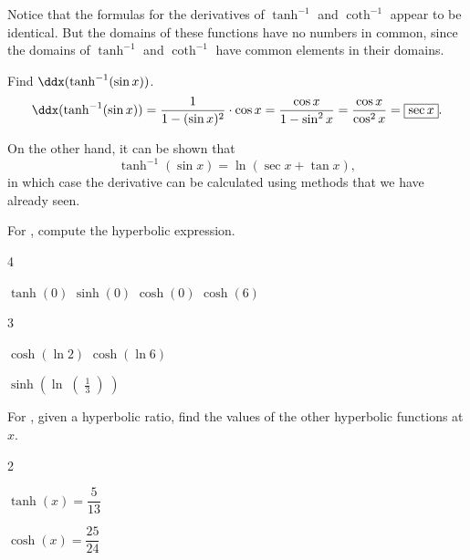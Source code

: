 \documentclass{book}
\begin{document}
Notice that the formulas for the derivatives of $\tanh^{-1}$ and $\coth^{-1}$ appear to be identical. But the domains of these functions have no numbers in common, since the domains of $\tanh^{-1}$ and $\coth^{-1}$ have common elements in their domains.

\begin{Exam} Find $\ddx(\tanh^{-1}(\sin x))$.\\
\[\ddx(\tanh^{-1}(\sin x)) = \dfrac{1}{1-(\sin x)^2}\cdot \cos x = \dfrac{\cos x}{1-\sin^2 x} = \dfrac{\cos x}{\cos^2 x} = \fbox{$\sec x$}.\]

On the other hand, it can be shown that \[\tanh^{-1}(\sin x) = \ln(\sec x + \tan x),\] in which case the derivative can be calculated using methods that we have already seen.
\end{Exam}\vs

\vfill
{}
\pagebreak

For , compute the hyperbolic expression.
\begin{enumerate}[!HW!]
\begin{multicols}{4}
\item\label{exer:hyperbolic:start} $\tanh(0)$
\itemspade $\sinh(0)$ 
\itemspade $\cosh(0)$
\itemspade $\cosh(6)$
\end{multicols}
\begin{multicols}{3}
\item $\cosh(\ln 2)$
\itemspade $\cosh(\ln 6)$ 
\item\label{exer:hyperbolic:stop} $\sinh\left(\ln\middle(\frac{1}{3}\middle)\right)$ 
\end{multicols}
\end{enumerate}

For , given a hyperbolic ratio, find the values of the other hyperbolic functions at $x$.
\begin{enumerate}[!HW!, label=$\spadesuit$ \arabic*., ref=\arabic*]
\begin{multicols}{2}
\item%
\label{exer:hyperbolictriangle:start} $\tanh(x)=\dfrac{5}{13}$ 
\item%
\label{exer:hyperbolictriangle:stop} $\cosh(x)=\dfrac{25}{24}$ 
\end{multicols}
\end{enumerate}
\end{document}
